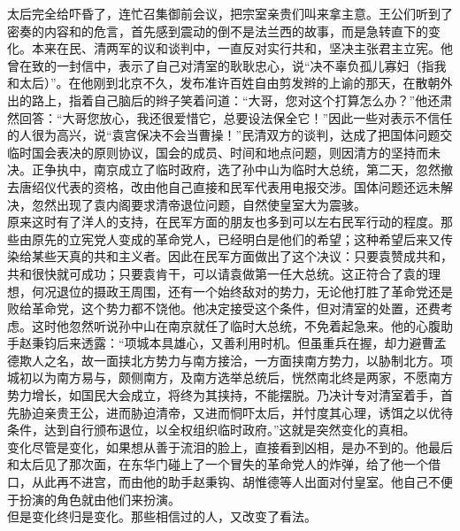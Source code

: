 太后完全给吓昏了，连忙召集御前会议，把宗室亲贵们叫来拿主意。王公们听到了密奏的内容和的危言，首先感到震动的倒不是法兰西的故事，而是急转直下的变化。本来在民、清两军的议和谈判中，一直反对实行共和，坚决主张君主立宪。他曾在致的一封信中，表示了自己对清室的耿耿忠心，说“决不辜负孤儿寡妇（指我和太后）”。在他刚到北京不久，发布准许百姓自由剪发辫的上谕的那天，在散朝外出的路上，指着自己脑后的辫子笑着问道：“大哥，您对这个打算怎么办？”他还肃然回答：“大哥您放心，我还很爱惜它，总要设法保全它！”因此一些对表示不信任的人很为高兴，说“袁宫保决不会当曹操！”民清双方的谈判，达成了把国体问题交临时国会表决的原则协议，国会的成员、时间和地点问题，则因清方的坚持而未决。正争执中，南京成立了临时政府，选了孙中山为临时大总统，第二天，忽然撤去唐绍仪代表的资格，改由他自己直接和民军代表用电报交涉。国体问题还远未解决，忽然出现了袁内阁要求清帝退位问题，自然使皇室大为震骇。\\

原来这时有了洋人的支持，在民军方面的朋友也多到可以左右民军行动的程度。那些由原先的立宪党人变成的革命党人，已经明白是他们的希望；这种希望后来又传染给某些天真的共和主义者。因此在民军方面做出了这个决议：只要袁赞成共和，共和很快就可成功；只要袁肯干，可以请袁做第一任大总统。这正符合了袁的理想，何况退位的摄政王周围，还有一个始终敌对的势力，无论他打胜了革命党还是败给革命党，这个势力都不饶他。他决定接受这个条件，但对清室的处置，还费考虑。这时他忽然听说孙中山在南京就任了临时大总统，不免着起急来。他的心腹助手赵秉钧后来透露：“项城本具雄心，又善利用时机。但虽重兵在握，却力避曹孟德欺人之名，故一面挟北方势力与南方接洽，一方面挟南方势力，以胁制北方。项城初以为南方易与，颇侧南方，及南方选举总统后，恍然南北终是两家，不愿南方势力增长，如国民大会成立，将终为其挟持，不能摆脱。乃决计专对清室着手，首先胁迫亲贵王公，进而胁迫清帝，又进而恫吓太后，并忖度其心理，诱饵之以优待条件，达到自行颁布退位，以全权组织临时政府。”这就是突然变化的真相。\\

变化尽管是变化，如果想从善于流泪的脸上，直接看到凶相，是办不到的。他最后和太后见了那次面，在东华门碰上了一个冒失的革命党人的炸弹，给了他一个借口，从此再不进宫，而由他的助手赵秉钩、胡惟德等人出面对付皇室。他自己不便于扮演的角色就由他们来扮演。\\

但是变化终归是变化。那些相信过的人，又改变了看法。\\


